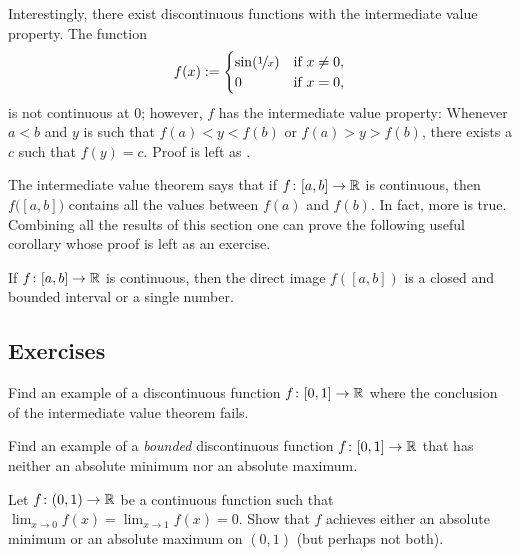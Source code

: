 \begin{example}
Interestingly,
there exist discontinuous functions with
the intermediate value property.
The function
\begin{equation*}
f(x) :=
\begin{cases}
\sin(\nicefrac{1}{x}) & \text{if } x \not= 0, \\
0 & \text{if } x=0,
\end{cases}
\end{equation*}
is not continuous at $0$; however, $f$ has the intermediate value property:
Whenever $a < b$ and $y$ is such that $f(a) < y < f(b)$
or $f(a) > y > f(b)$,
there exists a $c$ such that $f(y) = c$.
Proof is left as .
\end{example}

The intermediate value theorem says that if $f \colon [a,b] \to {\mathbb{R}}$ is
continuous, then $f\bigl([a,b]\bigr)$ contains all the values between $f(a)$ and
$f(b)$.  In fact, more is true.  Combining all the results of this section
one can prove the following useful corollary whose proof is left as an exercise.

\begin{cor} \label{cor:imageofinterval}
If $f \colon [a,b] \to {\mathbb{R}}$ is continuous, then the direct image $f([a,b])$
is a closed and bounded interval or a single number.
\end{cor}

\subsection{Exercises}

\begin{exercise}
Find an example of a discontinuous function $f \colon [0,1] \to {\mathbb{R}}$
where the conclusion of the intermediate value theorem fails.
\end{exercise}

\begin{exercise}
Find an example of a \emph{bounded} discontinuous function $f \colon [0,1]
\to {\mathbb{R}}$ that has neither an absolute minimum nor an absolute maximum.
\end{exercise}

\begin{exercise}
Let $f \colon (0,1) \to {\mathbb{R}}$ be a continuous function such that
$\displaystyle \lim_{x\to 0} f(x) =
\displaystyle \lim_{x\to 1} f(x) = 0$.  Show that
$f$ achieves either an absolute minimum or an absolute maximum on $(0,1)$
(but perhaps not both).
\end{exercise}

